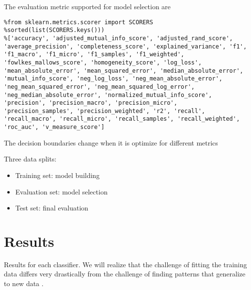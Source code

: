 \documentclass[11pt]{article}
\begin{document}

The evaluation metric supported for model selection are
\begin{lstlisting}
%from sklearn.metrics.scorer import SCORERS
%sorted(list(SCORERS.keys()))
%['accuracy', 'adjusted_mutual_info_score', 'adjusted_rand_score', 'average_precision', 'completeness_score', 'explained_variance', 'f1', 'f1_macro', 'f1_micro', 'f1_samples', 'f1_weighted', 'fowlkes_mallows_score', 'homogeneity_score', 'log_loss', 'mean_absolute_error', 'mean_squared_error', 'median_absolute_error', 'mutual_info_score', 'neg_log_loss', 'neg_mean_absolute_error', 'neg_mean_squared_error', 'neg_mean_squared_log_error', 'neg_median_absolute_error', 'normalized_mutual_info_score', 'precision', 'precision_macro', 'precision_micro', 'precision_samples', 'precision_weighted', 'r2', 'recall', 'recall_macro', 'recall_micro', 'recall_samples', 'recall_weighted', 'roc_auc', 'v_measure_score']
\end{lstlisting}
The decision boundaries change when it is optimize for different metrics

Three data splits:
\begin{itemize}
	\item Training set: model building
	\item Evaluation set: model selection 
	\item Test set: final evaluation
\end{itemize}

\section{Results}
Results for each classifier. We will realize that the challenge of fitting the training data differs very drastically from the challenge of finding patterns that generalize to new data \cite{goodfellow2016deep}.
\end{document}
